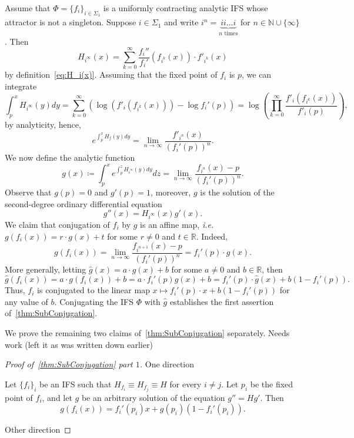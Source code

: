 \documentclass[12pt,]{article}
\theoremstyle{definition}
\theoremstyle{remark}
\renewcommand{\Bbb}[1]{\mathbb{#1}}
\newcommand{\bbR}{{\Bbb R}}        %
\newcommand{\0}{\mathbf{0}}
\newcommand{\ie}{{\it i.e.}\/ }
\begin{document}
{Assume that $\Phi=\{f_i\}_{i\in\Sigma_1}$ is a uniformly contracting analytic IFS whose attractor is not a singleton. Suppose $i\in\Sigma_1$ and write $i^{n}=\underbrace{ii\ldots i}_{n \text{ times}}$ for $n\in\mathbb{N}\cup\{\infty\}$. Then
\[
H_{i^{\infty}}(x)=\sum_{k=0}^\infty\frac{f_i''}{f_i'}(f_{i^k}(x))\cdot f'_{i^k}(x)
\]
by definition~\cref{eq:H_i(x)}. Assuming that the fixed point of $f_i$ is $p$, we can integrate
\[
\int_p^x H_{i^{\infty}}(y)dy=\sum_{k=0}^\infty\left(\log\left(f'_i(f_{i^k}(x))\right)-\log f_i'(p)\right)=\log\left(\prod_{k=0}^\infty\frac{f'_i(f_{i^k}(x))}{f'_i(p)}\right),
\]
by analyticity, hence,
\[
e^{\int_p^x H_f(y)dy}=\lim_{n\to\infty}\frac{f'_{i^n}(x)}{(f_i'(p))^n}.
\]
We now define the analytic function
\[
g(x)\coloneqq\int_p^xe^{\int_p^z H_{i^{\infty}}(y)dy}dz=\lim_{n\to\infty}\frac{f_{i^n}(x)-p}{(f_i'(p))^n}.
\]
Observe that $g(p)=0$ and $g'(p)=1$, moreover, $g$ is the solution of the second-degree ordinary differential equation
\[
g''(x)=H_{i^{\infty}}(x)g'(x).
\]
We claim that conjugation of $f_i$ by $g$ is an affine map, \ie $g(f_i(x))=r\cdot g(x)+t$ for some $r\neq0$ and $t\in\bbR$. Indeed,
\begin{equation*}
g(f_i(x)) = \lim_{n\to\infty}\frac{f_{i^{n+1}}(x)-p}{(f_i'(p))^n} = f_i'(p)\cdot g(x).
\end{equation*}
More generally, letting $\hat{g}(x)=a\cdot g(x)+b$ for some $a\neq0$ and $b\in\bbR$, then
\[
\hat{g}(f_i(x))=a\cdot g(f_i(x))+b=a\cdot f_i'(p) g(x)+b=f_i'(p)\cdot \hat{g}(x)+b(1-f_i'(p)).
\]
Thus, $f_i$ is conjugated to the linear map $x\mapsto f_i'(p)\cdot x+b(1-f_i'(p))$ for any value of $b$. Conjugating the IFS $\Phi$ with $\hat{g}$ establishes the first assertion of~\cref{thm:SubConjugation}.

We prove the remaining two claims of~\cref{thm:SubConjugation} separately. {\color{red} Needs work (left it as was written down earlier)}

\begin{proof}[Proof of~\cref{thm:SubConjugation} part $1$]
One direction

Let $\{f_i\}_{i}$ be an IFS such that $H_{f_i}\equiv H_{f_j}\equiv H$ for every $i\neq j$. Let $p_i$ be the fixed point of $f_i$, and let
$g$ be an arbitrary solution of the equation $g''=Hg'$. Then
$$
g(f_i(x))=f_i'(p_i)x+g(p_i)(1-f_i'(p_i)).
$$

Other direction


\end{proof}}
\end{document}
